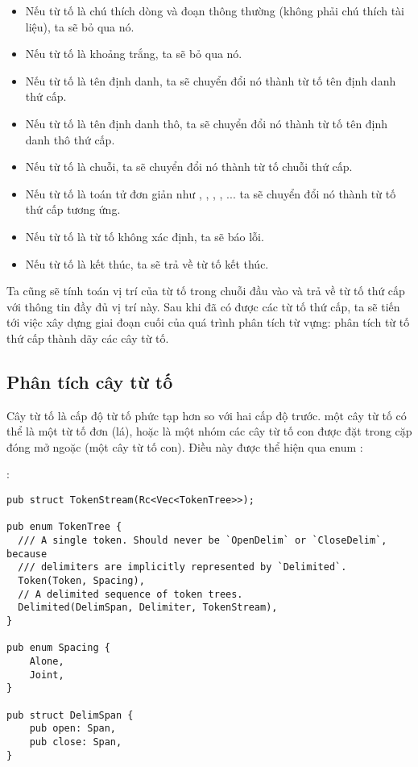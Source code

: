 \begin{itemize}
    \item Nếu từ tố là chú thích dòng và đoạn thông thường (không phải chú thích tài liệu), ta sẽ bỏ qua nó.
    \item Nếu từ tố là khoảng trắng, ta sẽ bỏ qua nó.
    \item Nếu từ tố là tên định danh, ta sẽ chuyển đổi nó thành từ tố tên định danh thứ cấp.
    \item Nếu từ tố là tên định danh thô, ta sẽ chuyển đổi nó thành từ tố tên định danh thô thứ cấp.
    \item Nếu từ tố là chuỗi, ta sẽ chuyển đổi nó thành từ tố chuỗi thứ cấp.
    \item Nếu từ tố là toán tử đơn giản như \kw{=}, \kw{<}, \kw{>}, \kw{!}, ... ta sẽ chuyển đổi nó thành từ tố thứ cấp tương ứng.
    \item Nếu từ tố là từ tố không xác định, ta sẽ báo lỗi.
    \item Nếu từ tố là kết thúc, ta sẽ trả về từ tố kết thúc.
\end{itemize}

    Ta cũng sẽ tính toán vị trí của từ tố trong chuỗi đầu vào và trả về từ tố thứ cấp với thông tin đầy đủ vị trí này. Sau khi đã có được các từ tố thứ cấp, ta sẽ tiến tới việc xây dựng giai đoạn cuối của quá trình phân tích từ vựng: phân tích từ tố thứ cấp thành dãy các cây từ tố.

\subsection{Phân tích cây từ tố}
    Cây từ tố là cấp độ từ tố phức tạp hơn so với hai cấp độ trước. một cây từ tố có thể là một từ tố đơn (lá), hoặc là một nhóm các cây từ tố con được đặt trong cặp đóng mở ngoặc (một cây từ tố con). Điều này được thể hiện qua enum :

\noindent {}:
\begin{lstlisting}
pub struct TokenStream(Rc<Vec<TokenTree>>);

pub enum TokenTree {
  /// A single token. Should never be `OpenDelim` or `CloseDelim`, because
  /// delimiters are implicitly represented by `Delimited`.
  Token(Token, Spacing),
  // A delimited sequence of token trees.
  Delimited(DelimSpan, Delimiter, TokenStream),
}

pub enum Spacing {
    Alone,
    Joint,
}

pub struct DelimSpan {
    pub open: Span,
    pub close: Span,
}
\end{lstlisting}

